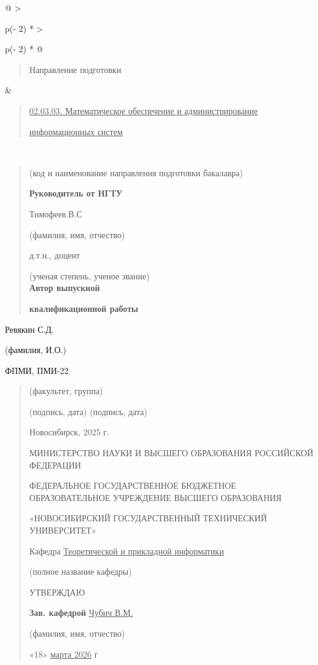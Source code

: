 \begin{longtable}[]{@{}
  >{\raggedright\arraybackslash}p{(\columnwidth - 2\tabcolsep) * }
  >{\raggedright\arraybackslash}p{(\columnwidth - 2\tabcolsep) * }@{}}
\toprule\noalign{}
\begin{minipage}[b]{\linewidth}\raggedright
\begin{quote}
Направление подготовки
\end{quote}
\end{minipage} & \begin{minipage}[b]{\linewidth}\raggedright
\begin{quote}
\ul{02.03.03. Математическое обеспечение и администрирование}

\ul{информационных систем}
\end{quote}
\end{minipage} \\
\midrule\noalign{}
\endhead
\bottomrule\noalign{}
\endlastfoot
\end{longtable}

\begin{quote}
(код и наименование направления подготовки бакалавра)

\textbf{Руководитель от НГТУ}

Тимофеев.В.С

(фамилия, имя, отчество)

д.т.н., доцент

(ученая степень, ученое звание)\\
\textbf{Автор выпускной}

\textbf{квалификационной работы}
\end{quote}

Ревякин С.Д.

(фамилия, И.О.)

ФПМИ, ПМИ-22

\begin{quote}
(факультет, группа)

(подпись, дата) (подпись, дата)

Новосибирск, 2025 г.

МИНИСТЕРСТВО НАУКИ И ВЫСШЕГО ОБРАЗОВАНИЯ РОССИЙСКОЙ ФЕДЕРАЦИИ

ФЕДЕРАЛЬНОЕ ГОСУДАРСТВЕННОЕ БЮДЖЕТНОЕ ОБРАЗОВАТЕЛЬНОЕ УЧРЕЖДЕНИЕ ВЫСШЕГО
ОБРАЗОВАНИЯ

«НОВОСИБИРСКИЙ ГОСУДАРСТВЕННЫЙ ТЕХНИЧЕСКИЙ УНИВЕРСИТЕТ»

Кафедра \ul{Теоретической и прикладной информатики}

(полное название кафедры)

УТВЕРЖДАЮ

\textbf{Зав. кафедрой} \ul{Чубич В.М.}

(фамилия, имя, отчество)

«18» \ul{марта 2026} г
\end{quote}

